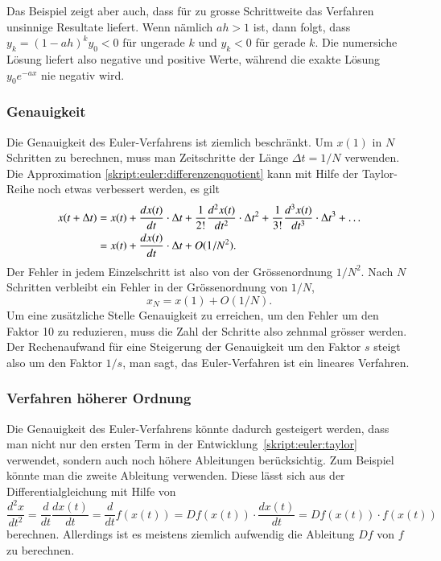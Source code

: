 Das Beispiel zeigt aber auch, dass für zu grosse Schrittweite das
Verfahren unsinnige Resultate liefert.
Wenn nämlich $ah>1$ ist, dann folgt, dass
$y_k=(1-ah)^k y_0  <0$ für ungerade $k$ und $y_k < 0$ für gerade $k$.
Die numersiche Lösung liefert also negative und positive Werte,
während die exakte Lösung $y_0e^{-ax}$ nie negativ wird.

\subsubsection{Genauigkeit}
Die Genauigkeit des Euler-Verfahrens ist ziemlich beschränkt.
Um $x(1)$ in $N$ Schritten zu berechnen, muss man Zeitschritte der
Länge $\Delta t=1/N$ verwenden.
Die Approximation \eqref{skript:euler:differenzenquotient} kann mit
Hilfe der Taylor-Reihe noch etwas verbessert werden, es gilt
\begin{align}
x(t+\Delta t)
&=
x(t) + \frac{d x(t) }{dt}\cdot \Delta t
+ \frac{1}{2!}\frac{d^2x(t)}{dt^2}\cdot \Delta t^2
+ \frac{1}{3!}\frac{d^3x(t)}{dt^3}\cdot \Delta t^3
+\dots
\label{skript:euler:taylor}
\\
&=
x(t) + \frac{d x(t) }{dt}\cdot \Delta t
+ O(1/N^2).
\notag
\end{align}
Der Fehler in jedem Einzelschritt ist also von der Grössenordnung $1/N^2$.
Nach $N$ Schritten verbleibt ein Fehler in der Grössenordnung von $1/N$,
\[
x_N = x(1) + O(1/N).
\]
Um eine zusätzliche Stelle Genauigkeit zu erreichen, um den Fehler um
den Faktor 10 zu reduzieren, muss die Zahl der Schritte also zehnmal 
grösser werden.
Der Rechenaufwand für eine Steigerung der Genauigkeit um den Faktor
$s$ steigt also um den Faktor $1/s$, man sagt, das Euler-Verfahren ist
ein lineares Verfahren.

\subsubsection{Verfahren höherer Ordnung}
Die Genauigkeit des Euler-Verfahrens könnte dadurch gesteigert
werden, dass man nicht nur den ersten Term in der
Entwicklung~\eqref{skript:euler:taylor} verwendet, sondern auch
noch höhere Ableitungen berücksichtig.
Zum Beispiel könnte man die zweite Ableitung verwenden.
Diese lässt sich aus der Differentialgleichung mit Hilfe von
\[
\frac{d^2x}{dt^2}
=
\frac{d}{dt} \frac{dx(t)}{dt}
=
\frac{d}{dt} f(x(t))
=
Df(x(t))\cdot \frac{dx(t)}{dt}
=
Df(x(t))\cdot f(x(t))
\]
berechnen.
Allerdings ist es meistens ziemlich aufwendig die Ableitung $Df$ von $f$ zu
berechnen.

